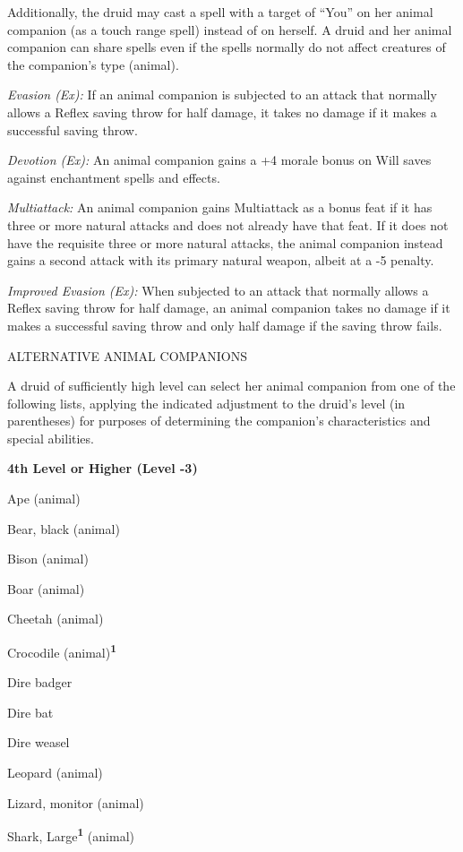 \documentclass{article}
\begin{document}
Additionally, the druid may cast a spell with a target of ``You'' on her animal 
companion (as a touch range spell) instead of on herself. A druid and her animal 
companion can share spells even if the spells normally do not affect creatures 
of the companion's type (animal).

\textit{Evasion (Ex): }If an animal companion is subjected to an attack that normally 
allows a Reflex saving throw for half damage, it takes no damage if it makes a 
successful saving throw.

\textit{Devotion (Ex): }An animal companion gains a +4 morale bonus on Will saves 
against enchantment spells and effects.

\textit{Multiattack: }An animal companion gains Multiattack as a bonus feat if 
it has three or more natural attacks and does not already have that feat. If it 
does not have the requisite three or more natural attacks, the animal companion 
instead gains a second attack with its primary natural weapon, albeit at a -5 penalty.

\textit{Improved Evasion (Ex): }When subjected to an attack that normally allows 
a Reflex saving throw for half damage, an animal companion takes no damage if it 
makes a successful saving throw and only half damage if the saving throw fails.

\vspace{12pt}
ALTERNATIVE ANIMAL COMPANIONS

A druid of sufficiently high level can select her animal companion from one of 
the following lists, applying the indicated adjustment to the druid's level (in 
parentheses) for purposes of determining the companion's characteristics and special 
abilities.

\vspace{12pt}
\textbf{4th Level or Higher (Level -3)}

Ape (animal) 

Bear, black (animal) 

Bison (animal)

Boar (animal) 

Cheetah (animal) 

Crocodile (animal)\textsuperscript{\textbf{1}}

Dire badger 

Dire bat

Dire weasel

Leopard (animal)

Lizard, monitor (animal)

Shark, Large\textsuperscript{\textbf{1}}\textbf{ }(animal)
\end{document}
